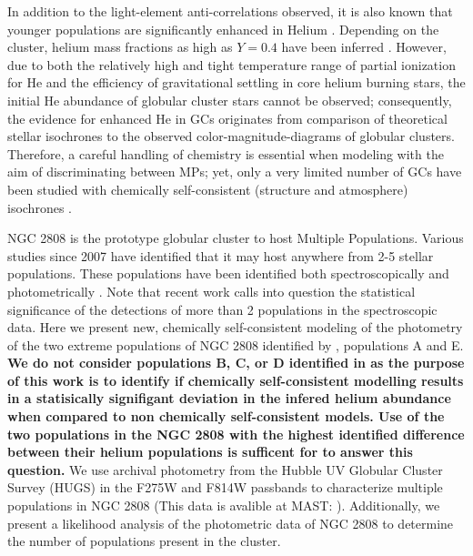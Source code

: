 In addition to the light-element anti-correlations observed, it is also known
that younger populations are significantly enhanced in Helium
\citep{Piotto2007, Piotto2015, Latour2019}. Depending on the cluster, helium
mass fractions as high as $Y=0.4$ have been inferred \citep[e.g][]{Milone2015}.
However, due to both the relatively high and tight temperature range of partial
ionization for He and the efficiency of gravitational settling in core helium
burning stars, the initial He abundance of globular cluster stars cannot be
observed; consequently, the evidence for enhanced He in GCs originates from
comparison of theoretical stellar isochrones to the observed
color-magnitude-diagrams of globular clusters. Therefore, a careful handling of
chemistry is essential when modeling with the aim of discriminating between
MPs; yet, only a very limited number of GCs have been studied with
chemically self-consistent (structure and atmosphere) isochrones
\citep[e.g.][NGC 6752]{Dotter2015}. 

NGC 2808 is the prototype globular cluster to host Multiple Populations.
Various studies since 2007 have identified that it may host anywhere from 2-5
stellar populations. These populations have been identified both
spectroscopically \citep[i.e.][]{Carretta2004, Carretta2006, Carretta2010,
Gratton2011, Carretta2015, Hong2021} and photometrically
\citep[i.e.][]{Piotto2007, Piotto2015, Milone2015, Milone2017, Pasquato2019}.
Note that recent work \citep{Valle2022} calls into question the statistical
significance of the detections of more than 2 populations in the spectroscopic
data. Here we present new, chemically self-consistent modeling of the
photometry of the two extreme populations of NGC 2808 identified by
\citet{Milone2015}, populations A and E. {\bf We do not consider populations B,
C, or D identified in \citet{Milone2015} as the purpose of this work is to
identify if chemically self-consistent modelling results in a statisically
signifigant deviation in the infered helium abundance when compared to non
chemically self-consistent models. Use of the two populations in the NGC 2808
with the highest identified difference between their helium populations is
sufficent for to answer this question.}  We use archival photometry from the
Hubble UV Globular Cluster Survey (HUGS) \citep{Piotto2015, Milone2017} in the
F275W and F814W passbands to characterize multiple populations in NGC 2808
\citep{Milone2015, Milone2015b} (This data is avalible at MAST:
). Additionally, we present a
likelihood analysis of the photometric data of NGC 2808 to determine the number
of populations present in the cluster.


